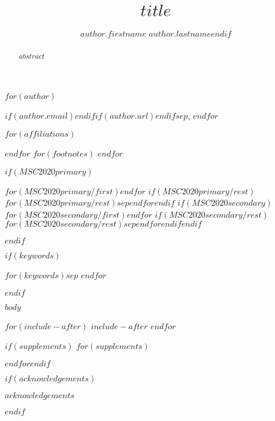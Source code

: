 \documentclass[ba]{imsart}
\numberwithin{equation}{section}
\theoremstyle{plain}
\begin{document}
\begin{frontmatter}

\title{$title$}
\begin{aug}
$for(author)$
\author{$author.firstname$ $author.lastname$$endif$}$if(author.email)$$endif$$if(author.url)$$endif$$sep$, $endfor$

$for(affiliations)$
\address[$it.ref$]{$it.name$,$it.address$}
$endfor$
$for(footnotes)$
$endfor$
\end{aug}

\begin{abstract}
$abstract$
\end{abstract}
$if(MSC2020primary)$ \begin{keyword}[class=MSC]
$for(MSC2020primary/first)$$endfor$
$if(MSC2020primary/rest)$$for(MSC2020primary/rest)$$sep $$endfor$$endif$
$if(MSC2020secondary)$$for(MSC2020secondary/first)$$endfor$
$if(MSC2020secondary/rest)$$for(MSC2020secondary/rest)$$sep $$endfor$$endif$$endif$\end{keyword}$endif$

$if(keywords)$ \begin{keyword} $for(keywords)$$sep$ $endfor$\end{keyword}$endif$
\end{frontmatter}

$body$

$for(include-after)$
$include-after$
$endfor$

$if(supplements)$
$for(supplements)$
\begin{supplement}
\end{supplement}
$endfor$$endif$

$if(acknowledgements)$
\begin{acks}[Acknowledgments]
$acknowledgements$
\end{acks}
$endif$



\end{document}

